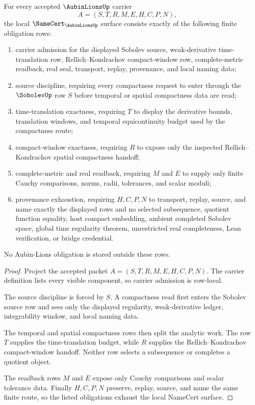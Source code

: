 \begin{theorem}
\label{thm:aubin-lions-namecert-obligations}
For every accepted $\AubinLionsUp$ carrier
$$
A=(S,T,R,M,E,H,C,P,N),
$$
the local $\NameCert_{\AubinLionsUp}$ surface consists exactly of the following finite obligation rows:
\begin{enumerate}
\item carrier admission for the displayed Sobolev source, weak-derivative time-translation row, Rellich--Kondrachov compact-window row, complete-metric readback, real seal, transport, replay, provenance, and local naming data;
\item source discipline, requiring every compactness request to enter through the $\SobolevUp$ row $S$ before temporal or spatial compactness data are read;
\item time-translation exactness, requiring $T$ to display the derivative bounds, translation windows, and temporal equicontinuity budget used by the compactness route;
\item compact-window exactness, requiring $R$ to expose only the inspected Rellich--Kondrachov spatial compactness handoff;
\item complete-metric and real readback, requiring $M$ and $E$ to supply only finite Cauchy comparisons, norms, radii, tolerances, and scalar moduli;
\item provenance exhaustion, requiring $H,C,P,N$ to transport, replay, source, and name exactly the displayed rows and no selected subsequence, quotient function equality, host compact embedding, ambient completed Sobolev space, global time regularity theorem, unrestricted real completeness, Lean verification, or bridge credential.
\end{enumerate}
No Aubin-Lions obligation is stored outside these rows.
\end{theorem}
\begin{proof}
Project the accepted packet $A=(S,T,R,M,E,H,C,P,N)$. The carrier definition lists every visible component, so carrier admission is row-local.

The source discipline is forced by $S$. A compactness read first enters the Sobolev source row and sees only the displayed regularity, weak-derivative ledger, integrability window, and local naming data.

The temporal and spatial compactness rows then split the analytic work. The row $T$ supplies the time-translation budget, while $R$ supplies the Rellich--Kondrachov compact-window handoff. Neither row selects a subsequence or completes a quotient object.

The readback rows $M$ and $E$ expose only Cauchy comparisons and scalar tolerance data. Finally $H,C,P,N$ preserve, replay, source, and name the same finite route, so the listed obligations exhaust the local NameCert surface.
\end{proof}

